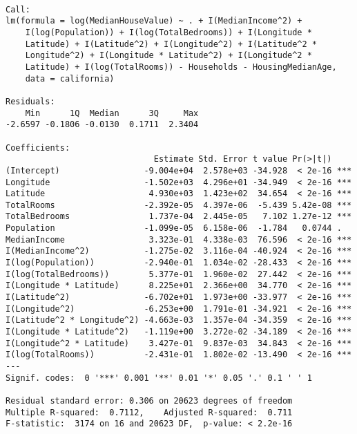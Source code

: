\documentclass[11pt]{article}
\begin{document}
    
    \begin{verbatim}

Call:
lm(formula = log(MedianHouseValue) ~ . + I(MedianIncome^2) + 
    I(log(Population)) + I(log(TotalBedrooms)) + I(Longitude * 
    Latitude) + I(Latitude^2) + I(Longitude^2) + I(Latitude^2 * 
    Longitude^2) + I(Longitude * Latitude^2) + I(Longitude^2 * 
    Latitude) + I(log(TotalRooms)) - Households - HousingMedianAge, 
    data = california)

Residuals:
    Min      1Q  Median      3Q     Max 
-2.6597 -0.1806 -0.0130  0.1711  2.3404 

Coefficients:
                              Estimate Std. Error t value Pr(>|t|)    
(Intercept)                 -9.004e+04  2.578e+03 -34.928  < 2e-16 ***
Longitude                   -1.502e+03  4.296e+01 -34.949  < 2e-16 ***
Latitude                     4.930e+03  1.423e+02  34.654  < 2e-16 ***
TotalRooms                  -2.392e-05  4.397e-06  -5.439 5.42e-08 ***
TotalBedrooms                1.737e-04  2.445e-05   7.102 1.27e-12 ***
Population                  -1.099e-05  6.158e-06  -1.784   0.0744 .  
MedianIncome                 3.323e-01  4.338e-03  76.596  < 2e-16 ***
I(MedianIncome^2)           -1.275e-02  3.116e-04 -40.924  < 2e-16 ***
I(log(Population))          -2.940e-01  1.034e-02 -28.433  < 2e-16 ***
I(log(TotalBedrooms))        5.377e-01  1.960e-02  27.442  < 2e-16 ***
I(Longitude * Latitude)      8.225e+01  2.366e+00  34.770  < 2e-16 ***
I(Latitude^2)               -6.702e+01  1.973e+00 -33.977  < 2e-16 ***
I(Longitude^2)              -6.253e+00  1.791e-01 -34.921  < 2e-16 ***
I(Latitude^2 * Longitude^2) -4.663e-03  1.357e-04 -34.359  < 2e-16 ***
I(Longitude * Latitude^2)   -1.119e+00  3.272e-02 -34.189  < 2e-16 ***
I(Longitude^2 * Latitude)    3.427e-01  9.837e-03  34.843  < 2e-16 ***
I(log(TotalRooms))          -2.431e-01  1.802e-02 -13.490  < 2e-16 ***
---
Signif. codes:  0 '***' 0.001 '**' 0.01 '*' 0.05 '.' 0.1 ' ' 1

Residual standard error: 0.306 on 20623 degrees of freedom
Multiple R-squared:  0.7112,	Adjusted R-squared:  0.711 
F-statistic:  3174 on 16 and 20623 DF,  p-value: < 2.2e-16

    \end{verbatim}
\end{document}
